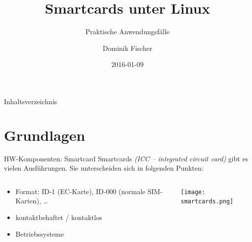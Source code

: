 \documentclass{beamer}
\begin{document}
\title[Smartcards unter Linux]{Smartcards unter Linux}
\subtitle[Praktische Anwendungsfälle]{Praktische Anwendungsfälle}
\author[domfi]{Dominik Fischer}
\date{2016-01-09}

\begin{frame}
\titlepage	
\end{frame}
\begin{frame}{Inhaltsverzeichnis}
	\tableofcontents
\end{frame}

\section{Grundlagen}

\begin{frame}{HW-Komponenten: Smartcard}
Smartcards \emph{(ICC -- integrated circuit card)} gibt es vielen Ausführungen.
Sie unterscheiden sich in folgenden Punkten:
\vspace{10mm}
\begin{columns}
\begin{column}{0.5\textwidth}
\begin{minipage}[t][\textheight][t]{\linewidth}
\begin{itemize}
  \item Format: ID-1 (EC-Karte), ID-000 (normale SIM-Karten), \ldots
  \item kontaktbehaftet / kontaktlos
  \item Betriebssysteme 
\end{itemize}
\end{minipage}
\end{column}
\begin{column}{0.5\textwidth}
\begin{minipage}[t][\textheight][t]{\linewidth}
\texttt{[image: smartcards.png]}
\end{minipage}
\end{column}
\end{columns}
\end{frame}
\end{document}
